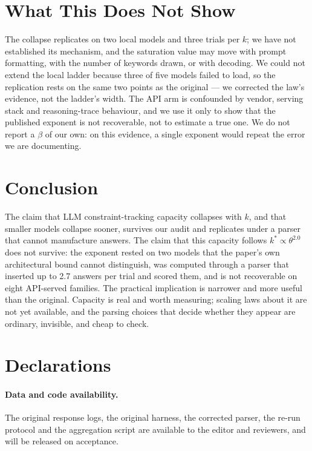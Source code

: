 \documentclass[preprint,12pt]{elsarticle}
\theoremstyle{plain}
\begin{document}
\section{What This Does Not Show}
\label{sec:limits}

The collapse replicates on two local models and three trials per $k$; we have not established its mechanism, and the saturation value may move with prompt formatting, with the number of keywords drawn, or with decoding. We could not extend the local ladder because three of five models failed to load, so the replication rests on the same two points as the original --- we corrected the law's evidence, not the ladder's width. The API arm is confounded by vendor, serving stack and reasoning-trace behaviour, and we use it only to show that the published exponent is not recoverable, not to estimate a true one. We do not report a $\beta$ of our own: on this evidence, a single exponent would repeat the error we are documenting.

\section{Conclusion}
\label{sec:conclusion}

The claim that LLM constraint-tracking capacity collapses with $k$, and that smaller models collapse sooner, survives our audit and replicates under a parser that cannot manufacture answers. The claim that this capacity follows $k^* \propto \theta^{2.0}$ does not survive: the exponent rested on two models that the paper's own architectural bound cannot distinguish, was computed through a parser that inserted up to 2.7 answers per trial and scored them, and is not recoverable on eight API-served families. The practical implication is narrower and more useful than the original. Capacity is real and worth measuring; scaling laws about it are not yet available, and the parsing choices that decide whether they appear are ordinary, invisible, and cheap to check.

\section*{Declarations}
\paragraph{Data and code availability.} The original response logs, the original harness, the corrected parser, the re-run protocol and the aggregation script are available to the editor and reviewers, and will be released on acceptance.
\end{document}
